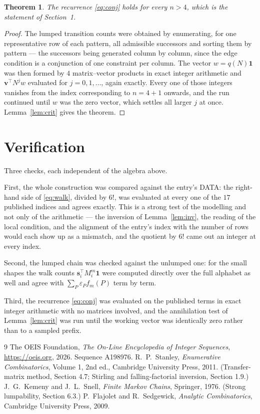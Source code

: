 \documentclass[11pt,a4paper]{article}
\theoremstyle{plain}
\newtheorem{theorem}{Theorem}
\theoremstyle{definition}
\begin{document}
\begin{theorem}
The recurrence \eqref{eq:conj} holds for every $n>4$, which is the statement of
Section~1.
\end{theorem}

\begin{proof}
The lumped transition counts were obtained by enumerating, for one representative row of
each pattern, all admissible successors and sorting them by pattern --- the successors being
generated column by column, since the edge condition is a conjunction of one constraint per
column. The vector $w=q(N)\mathbf{1}$ was then formed by $4$ matrix--vector products
in exact integer arithmetic and $\mathbf{v}^{\!\top}N^{j}w$ evaluated for
$j=0,1,\dots$, again exactly. Every one of those integers vanishes from the index
corresponding to $n=4+1$ onwards, and the run continued until $w$ was the zero vector,
which settles all larger $j$ at once. Lemma~\ref{lem:crit} gives the theorem.
\end{proof}

\section{Verification}

Three checks, each independent of the algebra above.

First, the whole construction was compared against the entry's DATA: the right-hand side of
\eqref{eq:walk}, divided by $6!$, was evaluated at every one of the $17$
published indices and agrees exactly. This is a strong test of the modelling and not only of
the arithmetic --- the inversion of Lemma~\ref{lem:inv}, the reading of the local
condition, and the alignment of the entry's index with the number of rows would each
show up as a mismatch, and the quotient by $6!$ came out an integer at every index.

Second, the lumped chain was checked against the unlumped one: for the small shapes the walk
counts $\mathbf{s}_i^{\!\top}M_i^{m}\mathbf{1}$ were computed directly over the full
alphabet as well and agree with $\sum_P\varepsilon_Pf_m(P)$ term by term.

Third, the recurrence \eqref{eq:conj} was evaluated on the published terms in exact integer
arithmetic with no matrices involved, and the annihilation test of Lemma~\ref{lem:crit} was
run until the working vector was identically zero rather than to a sampled prefix.

\begin{thebibliography}{9}
 The OEIS Foundation, \emph{The On-Line Encyclopedia of Integer
Sequences}, \url{https://oeis.org}, 2026. Sequence A198976.
 R.~P.~Stanley, \emph{Enumerative Combinatorics}, Volume 1, 2nd ed.,
Cambridge University Press, 2011. (Transfer-matrix method, Section 4.7; Stirling and
falling-factorial inversion, Section 1.9.)
 J.~G.~Kemeny and J.~L.~Snell, \emph{Finite Markov Chains}, Springer,
1976. (Strong lumpability, Section 6.3.)
 P.~Flajolet and R.~Sedgewick, \emph{Analytic Combinatorics}, Cambridge
University Press, 2009.
\end{thebibliography}
\end{document}
